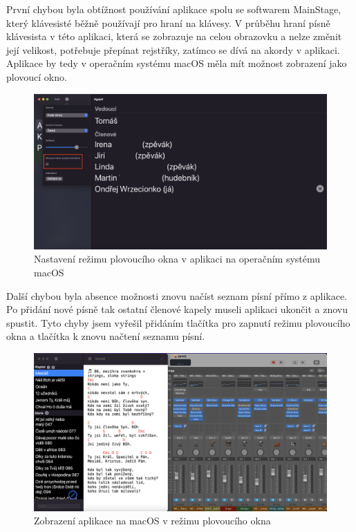 První chybou byla obtížnost používání aplikace spolu se softwarem MainStage, který klávesis\-té běžně používají pro hraní na klávesy. V průběhu hraní písně klávesista v této aplikaci, která se zobrazuje na celou obrazovku a nelze změnit její velikost, potřebuje přepínat rejstříky, zatímco se dívá na akordy v aplikaci. Aplikace by tedy v operačním systému macOS měla mít možnost zobrazení jako plovoucí okno.

\begin{figure}
    \includegraphics[width=\textwidth]{images/6-testovani/6-7-nastaveni-mac.png}
    \caption[Ukázka obrazovky Nastavení aplikace na macOS]{Nastavení režimu plovoucího okna v aplikaci na operačním systému macOS}
\end{figure}

Další chybou byla absence možnosti znovu načíst seznam písní přímo z aplikace. Po přidání nové písně tak ostatní členové kapely museli aplikaci ukončit a znovu spustit. Tyto chyby jsem vyřešil přidáním tlačítka pro zapnutí režimu plovoucího okna a tlačítka k znovu načtení seznamu písní.

\begin{figure}
    \includegraphics[width=\textwidth]{images/6-testovani/6-8-plovouci-okno.png}
    \caption{Zobrazení aplikace na macOS v režimu plovoucího okna}
\end{figure}

